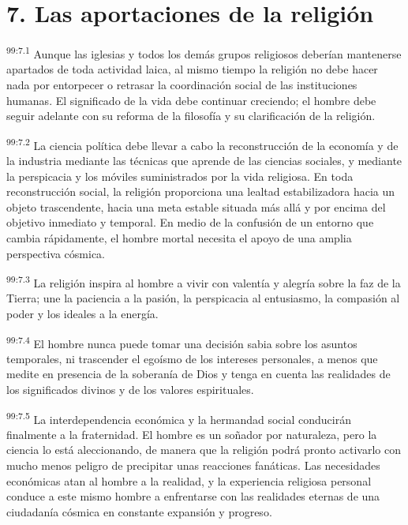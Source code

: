 \documentclass[twoside, 11pt]{book}
\begin{document}
\section*{7. Las aportaciones de la religión}
\par
\textsuperscript{99:7.1} Aunque las iglesias y todos los demás grupos religiosos deberían mantenerse apartados de toda actividad laica, al mismo tiempo la religión no debe hacer nada por entorpecer o retrasar la coordinación social de las instituciones humanas. El significado de la vida debe continuar creciendo; el hombre debe seguir adelante con su reforma de la filosofía y su clarificación de la religión.

\par
\textsuperscript{99:7.2} La ciencia política debe llevar a cabo la reconstrucción de la economía y de la industria mediante las técnicas que aprende de las ciencias sociales, y mediante la perspicacia y los móviles suministrados por la vida religiosa. En toda reconstrucción social, la religión proporciona una lealtad estabilizadora hacia un objeto trascendente, hacia una meta estable situada más allá y por encima del objetivo inmediato y temporal. En medio de la confusión de un entorno que cambia rápidamente, el hombre mortal necesita el apoyo de una amplia perspectiva cósmica.

\par
\textsuperscript{99:7.3} La religión inspira al hombre a vivir con valentía y alegría sobre la faz de la Tierra; une la paciencia a la pasión, la perspicacia al entusiasmo, la compasión al poder y los ideales a la energía.

\par
\textsuperscript{99:7.4} El hombre nunca puede tomar una decisión sabia sobre los asuntos temporales, ni trascender el egoísmo de los intereses personales, a menos que medite en presencia de la soberanía de Dios y tenga en cuenta las realidades de los significados divinos y de los valores espirituales.

\par
\textsuperscript{99:7.5} La interdependencia económica y la hermandad social conducirán finalmente a la fraternidad. El hombre es un soñador por naturaleza, pero la ciencia lo está aleccionando, de manera que la religión podrá pronto activarlo con mucho menos peligro de precipitar unas reacciones fanáticas. Las necesidades económicas atan al hombre a la realidad, y la experiencia religiosa personal conduce a este mismo hombre a enfrentarse con las realidades eternas de una ciudadanía cósmica en constante expansión y progreso.
\end{document}
